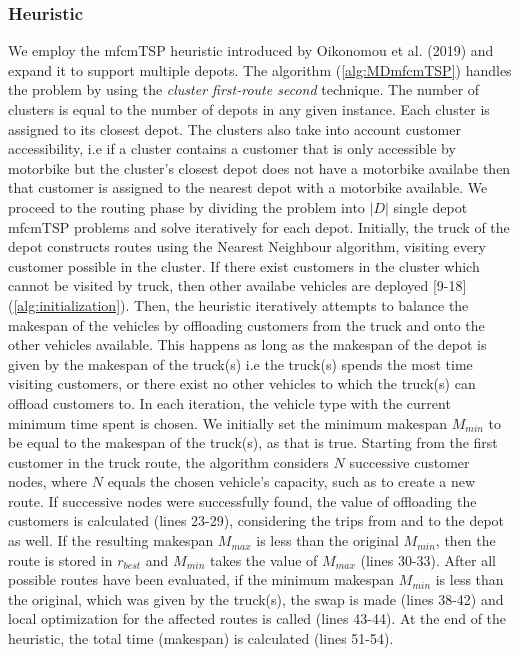\documentclass[twocolumn]{article}
\begin{document}
	\subsubsection{Heuristic}
	We employ the mfcmTSP heuristic introduced by Oikonomou et al. (2019) and expand it to support multiple depots. The algorithm (\ref{alg:MDmfcmTSP}) handles the problem by using the \textit{cluster first-route second} technique. The number of clusters is equal to the number of depots in any given instance. Each cluster is assigned to its closest depot. The clusters also take into account customer accessibility, i.e if a cluster contains a customer that is only accessible by motorbike but the cluster's closest depot does not have a motorbike availabe then that customer is assigned to the nearest depot with a motorbike available. We proceed to the routing phase by dividing the problem into $|D|$ single depot mfcmTSP problems and solve iteratively for each depot. Initially, the truck of the depot constructs routes using the Nearest Neighbour algorithm, visiting every customer possible in the cluster. If there exist customers in the cluster which cannot be visited by truck, then other availabe vehicles are deployed [9-18](\ref{alg:initialization}). Then, the heuristic iteratively attempts to balance the makespan of the vehicles by offloading customers from the truck and onto the other vehicles available. This happens as long as the makespan of the depot is given by the makespan of the truck(s) i.e the truck(s) spends the most time visiting customers, or there exist no other vehicles to which the truck(s) can offload customers to. In each iteration, the vehicle type with the current minimum time spent is chosen. We initially set the minimum makespan $M_{min}$ to be equal to the makespan of the truck(s), as that is true. Starting from the first customer in the truck route, the algorithm considers $N$ successive customer nodes, where $N$ equals the chosen vehicle's capacity, such as to create a new route. If successive nodes were successfully found, the value of offloading the customers is calculated (lines 23-29), considering the trips from and to the depot as well. If the resulting makespan $M_{max}$ is less than the original $M_{min}$, then the route is stored in $r_{best}$ and $M_{min}$ takes the value of $M_{max}$ (lines 30-33). After all possible routes have been evaluated, if the minimum makespan $M_{min}$ is less than the original, which was given by the truck(s), the swap is made (lines 38-42) and local optimization for the affected routes is called (lines 43-44). At the end of the heuristic, the total time (makespan) is calculated (lines 51-54). 
\end{document}
